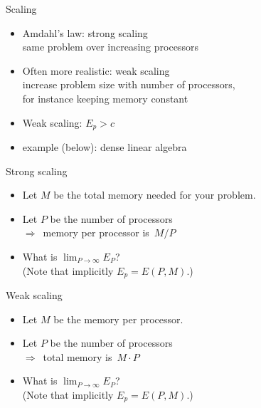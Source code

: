 \begin{numberedframe}{Scaling}
  \begin{itemize}
  \item Amdahl's law: strong scaling\\
    same problem over increasing processors
  \item Often more realistic: weak scaling\\
    increase problem size with number of processors,\\
    for instance keeping memory constant
  \item Weak scaling: $E_p>c$
  \item example (below): dense linear algebra
  \end{itemize}
\end{numberedframe}

\begin{numberedframe}{Strong scaling}
  \begin{itemize}
  \item
    Let $M$ be the total memory needed for your problem.
  \item Let $P$ be the number of processors\\
    $\Rightarrow$~memory per processor is~$M/P$
  \item What is $\lim_{P\rightarrow\infty} E_P$?\\
    (Note that implicitly $E_p=E(P,M)$.)
  \end{itemize}
\end{numberedframe}

\begin{numberedframe}{Weak scaling}
  \begin{itemize}
  \item
    Let $M$ be the memory per processor.
  \item Let $P$ be the number of processors\\
    $\Rightarrow$~total memory is~$M\cdot P$
  \item What is $\lim_{P\rightarrow\infty} E_P$?\\
    (Note that implicitly $E_p=E(P,M)$.)
  \end{itemize}
\end{numberedframe}

